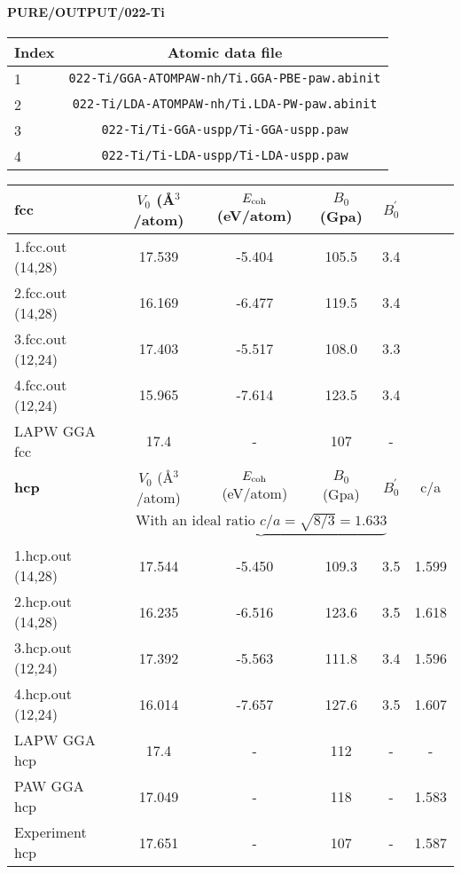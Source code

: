 \documentclass[onecolumn]{revtex4}
\begin{document}
\paragraph*{\bf{PURE/OUTPUT/022-Ti}}
\begin{center}
\begin{tabular}{lc}
\hline
Index & Atomic data file \\
\hline
1 & \verb?022-Ti/GGA-ATOMPAW-nh/Ti.GGA-PBE-paw.abinit?\\
2 & \verb?022-Ti/LDA-ATOMPAW-nh/Ti.LDA-PW-paw.abinit?\\
3 & \verb?022-Ti/Ti-GGA-uspp/Ti-GGA-uspp.paw?\\
4 & \verb?022-Ti/Ti-LDA-uspp/Ti-LDA-uspp.paw?\\
\hline
\end{tabular}
\end{center}
\begin{center}
\begin{tabular}{lccccc}
\hline
\hline
\bf{fcc}&$V_0$ (\AA$^3$/atom)&$E_{\rm coh}$ (eV/atom)&$B_0$ (Gpa)&$B_0^{'}$& \\
\hline
1.fcc.out (14,28)& 17.539 &-5.404 & 105.5 & 3.4 & \\ 
2.fcc.out (14,28)& 16.169 &-6.477 & 119.5 & 3.4 & \\ 
3.fcc.out (12,24)& 17.403 &-5.517 & 108.0 & 3.3 & \\ 
4.fcc.out (12,24)& 15.965 &-7.614 & 123.5 & 3.4 & \\ 
LAPW GGA fcc~\cite{Aguayo_PRB65_2002} & 17.4 & - & 107 & - \\ %
\hline
\hline
\bf{hcp}&$V_0$ (\AA$^3$/atom)&$E_{\rm coh}$ (eV/atom)&$B_0$ (Gpa)&$B_0^{'}$&c/a \\
&\multicolumn{4}{c}{$\underbrace{\mbox{With an ideal ratio } c/a=\sqrt{8/3}=1.633}_{}$} \\
\hline
1.hcp.out (14,28)& 17.544 &-5.450 & 109.3 & 3.5 & 1.599  \\ 
2.hcp.out (14,28)& 16.235 &-6.516 & 123.6 & 3.5 & 1.618  \\ 
3.hcp.out (12,24)& 17.392 &-5.563 & 111.8 & 3.4 & 1.596  \\ 
4.hcp.out (12,24)& 16.014 &-7.657 & 127.6 & 3.5 & 1.607  \\ 
LAPW GGA hcp~\cite{Aguayo_PRB65_2002} & 17.4 & - & 112 & - & - \\ %
PAW GGA hcp~\cite{Jahnatek_PRB71_2005} & 17.049 & - & 118 & - & 1.583 \\ %
Experiment hcp~\cite{Simmons_1971} & 17.651 & - & 107 & - & 1.587 \\ %
\hline
\hline
\end{tabular}
\end{center}
\end{document}

